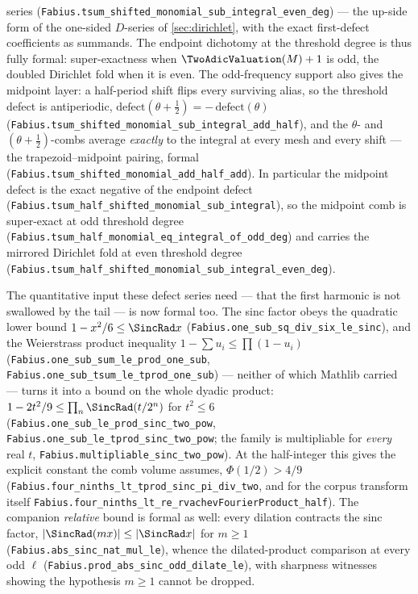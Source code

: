 series
(\nolinkurl{Fabius.tsum_shifted_monomial_sub_integral_even_deg}) --- the up-side form of
the one-sided $D$-series of \cref{sec:dirichlet}, with the exact first-defect
coefficients as summands.  The endpoint dichotomy at the threshold degree is thus
fully formal: super-exactness when $\TwoAdicValuation(M)+1$ is odd, the doubled Dirichlet fold
when it is even.  The odd-frequency support also gives the midpoint layer: a
half-period shift flips every surviving alias, so the threshold defect is
antiperiodic,
$\mathrm{defect}(\theta+\tfrac12)=-\,\mathrm{defect}(\theta)$
(\nolinkurl{Fabius.tsum_shifted_monomial_sub_integral_add_half}), and the $\theta$- and
$(\theta+\tfrac12)$-combs average \emph{exactly} to the integral at every mesh and
every shift --- the trapezoid--midpoint pairing, formal
(\nolinkurl{Fabius.tsum_shifted_monomial_add_half_add}).  In particular the midpoint
defect is the exact negative of the endpoint defect
(\nolinkurl{Fabius.tsum_half_shifted_monomial_sub_integral}), so the midpoint comb is
super-exact at odd threshold degree
(\nolinkurl{Fabius.tsum_half_monomial_eq_integral_of_odd_deg}) and carries the mirrored
Dirichlet fold at even threshold degree
(\nolinkurl{Fabius.tsum_half_shifted_monomial_sub_integral_even_deg}).

The quantitative input these defect series need --- that the first harmonic is not
swallowed by the tail --- is now formal too.  The sinc factor obeys the quadratic lower
bound \(1-x^2/6\le\SincRad x\) (\nolinkurl{Fabius.one_sub_sq_div_six_le_sinc}),
and the Weierstrass product inequality \(1-\sum u_i\le\prod(1-u_i)\)
(\nolinkurl{Fabius.one_sub_sum_le_prod_one_sub}, \nolinkurl{Fabius.one_sub_tsum_le_tprod_one_sub}) ---
neither of which Mathlib carried --- turns it into a bound on the whole dyadic product:
\(1-2t^2/9\le\prod_{n}\SincRad(t/2^n)\) for \(t^2\le6\)
(\nolinkurl{Fabius.one_sub_le_prod_sinc_two_pow}, \nolinkurl{Fabius.one_sub_le_tprod_sinc_two_pow};
the family is multipliable for \emph{every} real \(t\),
\nolinkurl{Fabius.multipliable_sinc_two_pow}).  At the half-integer this gives the
explicit constant the comb volume assumes,
\(\Phi(1/2)>4/9\)
(\nolinkurl{Fabius.four_ninths_lt_tprod_sinc_pi_div_two}, and for the corpus transform
itself \nolinkurl{Fabius.four_ninths_lt_re_rvachevFourierProduct_half}).  The companion
\emph{relative} bound is formal as well: every dilation contracts the sinc factor,
\(\lvert\SincRad(mx)\rvert\le\lvert\SincRad x\rvert\) for \(m\ge1\)
(\nolinkurl{Fabius.abs_sinc_nat_mul_le}), whence the dilated-product comparison at every
odd \(\ell\) (\nolinkurl{Fabius.prod_abs_sinc_odd_dilate_le}), with sharpness witnesses
showing the hypothesis \(m\ge1\) cannot be dropped.

